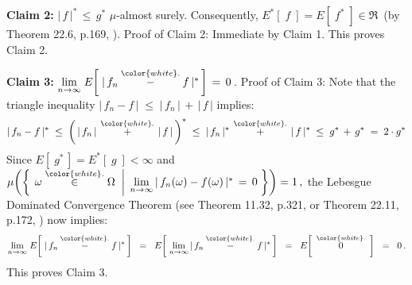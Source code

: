 \vskip 0.5cm
\noindent
\textbf{Claim 2:}\quad
$\vert\,f\,\vert^{*} \,\leq\, g^{*}$\; $\mu$-almost surely.
Consequently, $E^{*}\!\left[\;f\;\right] = E\!\left[\;f^{*}\;\right] \in \Re$\, (by Theorem 22.6, p.169, \cite{Aliprantis1998}).
\vskip 0.1cm
\noindent
Proof of Claim 2:\quad
Immediate by Claim 1.
This proves Claim 2.

\vskip 0.5cm
\noindent
\textbf{Claim 3:}\quad
$\underset{n\rightarrow\infty}{\lim}\;E\!\left[\;\vert\,f_{n} \overset{{\color{white}.}}{-} f\,\vert^{*}\,\right] \,=\, 0$\,.
\vskip 0.1cm
\noindent
Proof of Claim 3:\quad
Note that the triangle inequality \;$\vert\,f_{n}-f\,\vert \; \leq \; \vert\,f_{n}\,\vert \,+\, \vert\,f\,\vert$\; implies:
\begin{equation*}
\vert\,f_{n}-f\,\vert^{*}
\; \leq \;
	\left(\,\vert\,f_{n}\,\vert \,\overset{{\color{white}.}}{+}\, \vert\,f\,\vert\,\right)^{*}
\; \leq \;
	\vert\,f_{n}\,\vert^{*} \,\overset{{\color{white}.}}{+}\, \vert\,f\,\vert^{*}
\; \leq \;
	g^{*} \,+\, g^{*}
\; = \;
	2 \cdot g^{*}
\end{equation*}
Since \;$E\!\left[\;g^{*}\,\right] = E^{*}\!\left[\;g\;\right] < \infty$\;
and
\;$\mu\!\left(\left\{\;
	\left.
	\omega \overset{{\color{white}.}}{\in} \Omega
	\;\;\right\vert\;
	\underset{n\rightarrow\infty}{\lim}\,\vert\, f_{n}(\omega) - f(\omega) \,\vert^{*} \,=\, 0
	\;\right\}\right)
= 1\,,$\;
the Lebesgue Dominated Convergence Theorem
(see Theorem 11.32, p.321, \cite{Rudin1976} or Theorem 22.11, p.172, \cite{Aliprantis1998})
now implies:
\begin{equation*}
\underset{n\rightarrow\infty}{\lim}\;E\!\left[\;\vert\,f_{n} \overset{{\color{white}.}}{-} f\,\vert^{*}\,\right]
\;\; = \;\;
	E\!\left[\;\underset{n\rightarrow\infty}{\lim}\,\vert\,f_{n} \overset{{\color{white}.}}{-} f\,\vert^{*}\,\right]
\;\; = \;\;
	E\!\left[\;\, \overset{{\color{white}.}}{0} \,\;\right]
\;\; = \;\;
	0\,.
\end{equation*}
This proves Claim 3.

